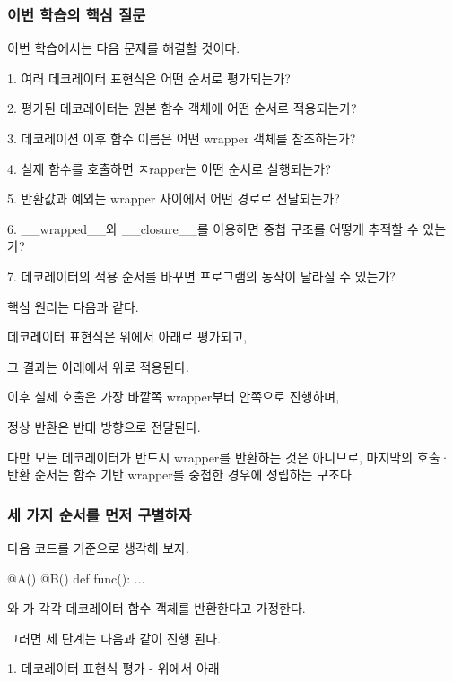 \subsubsection{이번 학습의 핵심 질문}

이번 학습에서는 다음 문제를 해결할 것이다.

\begin{dhksmry}
1. 여러 데코레이터 표현식은 어떤 순서로 평가되는가?

2. 평가된 데코레이터는 원본 함수 객체에 어떤 순서로 적용되는가?

3. 데코레이션 이후 함수 이름은 어떤 wrapper 객체를 참조하는가?

4. 실제 함수를 호출하면 ㅈrapper는 어떤 순서로 실행되는가?

5. 반환값과 예외는 wrapper 사이에서 어떤 경로로 전달되는가?

6. __wrapped__와 __closure__를 이용하면 중첩 구조를 어떻게
   추적할 수 있는가?

7. 데코레이터의 적용 순서를 바꾸면 프로그램의 동작이 달라질 수 있는가?
\end{dhksmry}

핵심 원리는 다음과 같다.

\begin{dhksmry}[centered]
데코레이터 표현식은 위에서 아래로 평가되고, 

그 결과는 아래에서 위로 적용된다.

이후 실제 호출은 가장 바깥쪽 wrapper부터 안쪽으로 진행하며,

정상 반환은 반대 방향으로 전달된다.
\end{dhksmry}

다만 모든 데코레이터가 반드시 wrapper를 반환하는 것은 아니므로, 마지막의 호출·반환 순서는 함수 기반 wrapper를 중첩한 경우에 성립하는 구조다.

\subsubsection{세 가지 순서를 먼저 구별하자}

다음 코드를 기준으로 생각해 보자.

\begin{dhkcode}
@A()
@B()
def func():
    ...
\end{dhkcode}

와 가 각각 데코레이터 함수 객체를 반환한다고 가정한다.

그러면 세 단계는 다음과 같이 진행 된다.

\begin{dhknote}
\begin{dhksmry}[centered]
1. 데코레이터 표현식 평가 - 위에서 아래
\end{dhksmry}
\end{dhknote}

